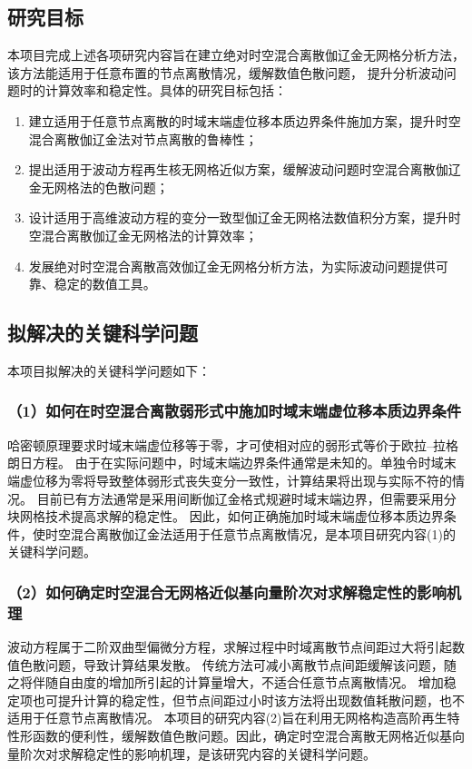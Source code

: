 \subsection{研究目标}
本项目完成上述各项研究内容旨在建立绝对时空混合离散伽辽金无网格分析方法，该方法能适用于任意布置的节点离散情况，缓解数值色散问题，
提升分析波动问题时的计算效率和稳定性。具体的研究目标包括：
\begin{enumerate}[label={\rmfamily (\theenumi)},left=24pt]
    \item 建立适用于任意节点离散的时域末端虚位移本质边界条件施加方案，提升时空混合离散伽辽金法对节点离散的鲁棒性；
    \item 提出适用于波动方程再生核无网格近似方案，缓解波动问题时空混合离散伽辽金无网格法的色散问题；
    \item 设计适用于高维波动方程的变分一致型伽辽金无网格法数值积分方案，提升时空混合离散伽辽金无网格法的计算效率；
    \item 发展绝对时空混合离散高效伽辽金无网格分析方法，为实际波动问题提供可靠、稳定的数值工具。
\end{enumerate}

\subsection{拟解决的关键科学问题}

本项目拟解决的关键科学问题如下：

\subsubsection*{\bfseries （1）如何在时空混合离散弱形式中施加时域末端虚位移本质边界条件}
哈密顿原理要求时域末端虚位移等于零，才可使相对应的弱形式等价于欧拉--拉格朗日方程。
由于在实际问题中，时域末端边界条件通常是未知的。单独令时域末端虚位移为零将导致整体弱形式丧失变分一致性，计算结果将出现与实际不符的情况。
目前已有方法通常是采用间断伽辽金格式规避时域末端边界，但需要采用分块网格技术提高求解的稳定性。
因此，如何正确施加时域末端虚位移本质边界条件，使时空混合离散伽辽金法适用于任意节点离散情况，是本项目研究内容(1)的关键科学问题。

\subsubsection*{\bfseries （2）如何确定时空混合无网格近似基向量阶次对求解稳定性的影响机理}
波动方程属于二阶双曲型偏微分方程，求解过程中时域离散节点间距过大将引起数值色散问题，导致计算结果发散。
传统方法可减小离散节点间距缓解该问题，随之将伴随自由度的增加所引起的计算量增大，不适合任意节点离散情况。
增加稳定项也可提升计算的稳定性，但节点间距过小时该方法将出现数值耗散问题，也不适用于任意节点离散情况。
本项目的研究内容(2)旨在利用无网格构造高阶再生特性形函数的便利性，缓解数值色散问题。因此，确定时空混合离散无网格近似基向量阶次对求解稳定性的影响机理，是该研究内容的关键科学问题。

